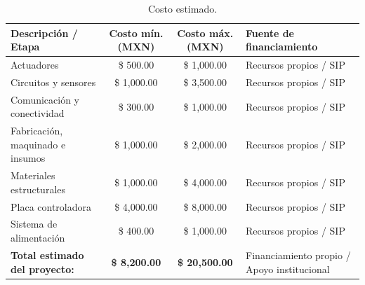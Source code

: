 \begin{table}[H]
    \centering
    \caption{Costo estimado.}
    \label{tab:proto-presupuesto-etapas}
    \begin{tabularx}{\textwidth}{Y c c J{4.2cm}}
        \toprule
        \textbf{Descripción / Etapa} & \textbf{Costo mín. (MXN)} & \textbf{Costo máx. (MXN)} & \textbf{Fuente de financiamiento} \\
        \midrule
        Actuadores & \$ 500.00 & \$ 1,000.00 & Recursos propios / SIP \\
        Circuitos y sensores   & \$ 1,000.00 & \$ 3,500.00 & Recursos propios / SIP \\
        Comunicación y conectividad   & \$ 300.00 & \$ 1,000.00 & Recursos propios / SIP \\
        Fabricación, maquinado e insumos   & \$ 1,000.00 & \$ 2,000.00 & Recursos propios / SIP \\
        Materiales estructurales & \$ 1,000.00 & \$ 4,000.00 & Recursos propios / SIP \\
        Placa controladora & \$ 4,000.00 & \$ 8,000.00 & Recursos propios / SIP \\
        Sistema de alimentación & \$ 400.00 & \$ 1,000.00 & Recursos propios / SIP \\
        \midrule
        \textbf{Total estimado del proyecto:} & \textbf{\$ 8,200.00} & \textbf{\$ 20,500.00} & Financiamiento propio / Apoyo institucional \\
        \bottomrule
    \end{tabularx}
\end{table}




